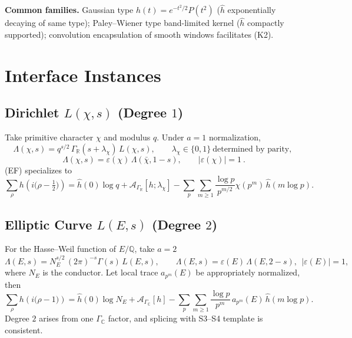 \documentclass[11pt,a4paper]{article}
\theoremstyle{remark}
\begin{document}
\textbf{Common families.} Gaussian type $h(t)=e^{-t^2/2}P(t^2)$ ($\widehat{h}$ exponentially decaying of same type); Paley--Wiener type band-limited kernel ($\widehat{h}$ compactly supported); convolution encapsulation of smooth windows facilitates (K2).

\section{Interface Instances}

\subsection{Dirichlet $L(\chi,s)$ (Degree $1$)}

Take primitive character $\chi$ and modulus $q$. Under $a=1$ normalization,
\begin{equation}
\Lambda(\chi,s)=q^{s/2}\,\Gamma_{\mathbb{R}}(s+\lambda_\chi)\,L(\chi,s),\qquad
\lambda_\chi\in\{0,1\}\ \text{determined by parity},
\end{equation}
\begin{equation}
\boxed{\ \Lambda(\chi,s)=\varepsilon(\chi)\,\Lambda(\bar{\chi},1-s),\qquad |\varepsilon(\chi)|=1\ }.
\end{equation}
(EF) specializes to
\begin{equation}
\sum_{\rho} h\!\left(i\big(\rho-\tfrac{1}{2}\big)\right)
=\widehat{h}(0)\log q+\mathcal{A}_{\Gamma_{\mathbb{R}}}[h;\lambda_\chi]
-\sum_{p}\sum_{m\ge1}\frac{\log p}{p^{m/2}}\chi(p^m)\,\widehat{h}(m\log p).
\end{equation}

\subsection{Elliptic Curve $L(E,s)$ (Degree $2$)}

For the Hasse--Weil function of $E/\mathbb{Q}$, take $a=2$
\begin{equation}
\Lambda(E,s)=N_E^{s/2}\,(2\pi)^{-s}\Gamma(s)\,L(E,s),\qquad
\Lambda(E,s)=\varepsilon(E)\,\Lambda(E,2-s),\ \ |\varepsilon(E)|=1,
\end{equation}
where $N_E$ is the conductor. Let local trace $a_{p^m}(E)$ be appropriately normalized, then
\begin{equation}
\sum_{\rho} h\!\left(i\big(\rho-1\big)\right)
=\widehat{h}(0)\log N_E+\mathcal{A}_{\Gamma_{\mathbb{C}}}[h]
-\sum_{p}\sum_{m\ge1}\frac{\log p}{p^{m}}\,a_{p^m}(E)\,\widehat{h}(m\log p).
\end{equation}
Degree $2$ arises from one $\Gamma_{\mathbb{C}}$ factor, and splicing with S3--S4 template is consistent.
\end{document}
